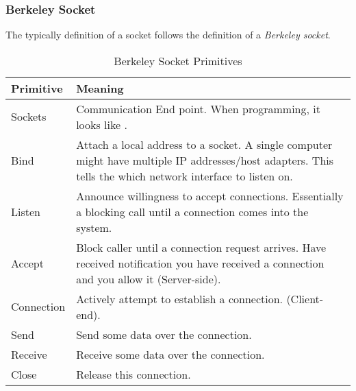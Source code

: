 \subsubsection{Berkeley Socket}\label{subsubsec:Berkeley_Socket}
The typically definition of a socket follows the definition of a \emph{Berkeley socket}.
\begin{table}[h!tbp]
  \centering
  \begin{tabular}{lp{16cm}}
    \toprule
    Primitive & Meaning\\
    \midrule
    Sockets & Communication End point. When programming, it looks like \nameref{def:File_Descriptor}. \\
    Bind & Attach a local address to a socket. A single computer might have multiple IP addresses/host adapters. This tells the \nameref{def:Process} which network interface to listen on. \\
    Listen & Announce willingness to accept connections. Essentially a blocking call until a connection comes into the system. \\
    Accept & Block caller until a connection request arrives. Have received notification you have received a connection and you allow it (Server-side). \\
    Connection & Actively attempt to establish a connection. (Client-end). \\
    Send & Send some data over the connection. \\
    Receive & Receive some data over the connection. \\
    Close & Release this connection. \\
    \bottomrule
  \end{tabular}
  \caption{Berkeley Socket Primitives}
  \label{tab:Berkley_Socket_Primitives}
\end{table}


